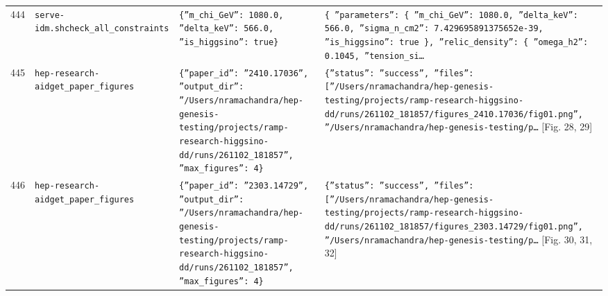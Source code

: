 \documentclass[11pt,a4paper]{article}
\begin{document}
\begin{longtable}{@{}p{}p{}p{}p{}@{}}
444 & \texttt{serve-idm.sh}\newline\texttt{check\_\allowbreak{}all\_\allowbreak{}constraints} & \texttt{\{''m\_\allowbreak{}chi\_\allowbreak{}GeV'':\allowbreak{} 1080.0,\allowbreak{} ''delta\_\allowbreak{}keV'':\allowbreak{} 566.0,\allowbreak{} ''is\_\allowbreak{}higgsino'':\allowbreak{} true\}\allowbreak{}} & \texttt{\{   ''parameters'':\allowbreak{} \{     ''m\_\allowbreak{}chi\_\allowbreak{}GeV'':\allowbreak{} 1080.0,\allowbreak{}     ''delta\_\allowbreak{}keV'':\allowbreak{} 566.0,\allowbreak{}     ''sigma\_\allowbreak{}n\_\allowbreak{}cm2'':\allowbreak{} 7.429695891375652e-39,\allowbreak{}     ''is\_\allowbreak{}higgsino'':\allowbreak{} true   \}\allowbreak{},\allowbreak{}   ''relic\_\allowbreak{}density'':\allowbreak{} \{     ''omega\_\allowbreak{}h2'':\allowbreak{} 0.1045,\allowbreak{}     ''tension\_\allowbreak{}si\ldots{}\allowbreak{}} \\
445 & \texttt{hep-research-aid}\newline\texttt{get\_\allowbreak{}paper\_\allowbreak{}figures} & \texttt{\{''paper\_\allowbreak{}id'':\allowbreak{} ''2410.17036'',\allowbreak{} ''output\_\allowbreak{}dir'':\allowbreak{} ''/\allowbreak{}Users/\allowbreak{}nramachandra/\allowbreak{}hep-genesis-testing/\allowbreak{}projects/\allowbreak{}ramp-research-higgsino-dd/\allowbreak{}runs/\allowbreak{}261102\_\allowbreak{}181857'',\allowbreak{} ''max\_\allowbreak{}figures'':\allowbreak{} 4\}\allowbreak{}} & \texttt{\{''status'':\allowbreak{} ''success'',\allowbreak{} ''files'':\allowbreak{} [''/\allowbreak{}Users/\allowbreak{}nramachandra/\allowbreak{}hep-genesis-testing/\allowbreak{}projects/\allowbreak{}ramp-research-higgsino-dd/\allowbreak{}runs/\allowbreak{}261102\_\allowbreak{}181857/\allowbreak{}figures\_\allowbreak{}2410.17036/\allowbreak{}fig01.png'',\allowbreak{} ''/\allowbreak{}Users/\allowbreak{}nramachandra/\allowbreak{}hep-genesis-testing/\allowbreak{}p\ldots{}\allowbreak{}} [Fig. 28, 29] \\
446 & \texttt{hep-research-aid}\newline\texttt{get\_\allowbreak{}paper\_\allowbreak{}figures} & \texttt{\{''paper\_\allowbreak{}id'':\allowbreak{} ''2303.14729'',\allowbreak{} ''output\_\allowbreak{}dir'':\allowbreak{} ''/\allowbreak{}Users/\allowbreak{}nramachandra/\allowbreak{}hep-genesis-testing/\allowbreak{}projects/\allowbreak{}ramp-research-higgsino-dd/\allowbreak{}runs/\allowbreak{}261102\_\allowbreak{}181857'',\allowbreak{} ''max\_\allowbreak{}figures'':\allowbreak{} 4\}\allowbreak{}} & \texttt{\{''status'':\allowbreak{} ''success'',\allowbreak{} ''files'':\allowbreak{} [''/\allowbreak{}Users/\allowbreak{}nramachandra/\allowbreak{}hep-genesis-testing/\allowbreak{}projects/\allowbreak{}ramp-research-higgsino-dd/\allowbreak{}runs/\allowbreak{}261102\_\allowbreak{}181857/\allowbreak{}figures\_\allowbreak{}2303.14729/\allowbreak{}fig01.png'',\allowbreak{} ''/\allowbreak{}Users/\allowbreak{}nramachandra/\allowbreak{}hep-genesis-testing/\allowbreak{}p\ldots{}\allowbreak{}} [Fig. 30, 31, 32] \\

\end{longtable}
\end{document}
